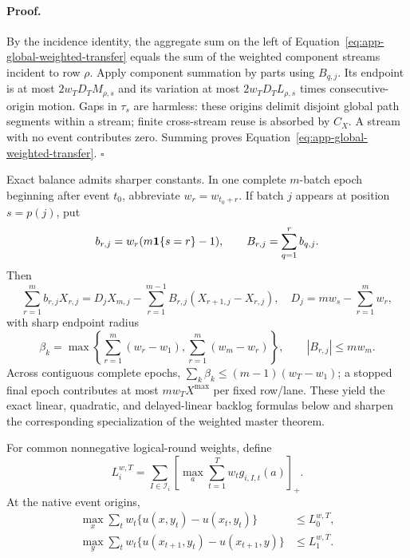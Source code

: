\paragraph{Proof.}
By the incidence identity, the aggregate sum on the left of
Equation~\ref{eq:app-global-weighted-transfer} equals the sum of the weighted
component streams incident to row $\rho$.  Apply component summation by parts
using $B_{q,j}$.  Its endpoint is at most
$2w_TD_TM_{\rho,s}$ and its variation at most
$2w_TD_TL_{\rho,s}$ times consecutive-origin motion.  Gaps in $\tau_s$ are
harmless: these origins delimit disjoint global path segments within a stream;
finite cross-stream reuse is absorbed by $C_X$.  A stream with no event
contributes zero.  Summing proves
Equation~\ref{eq:app-global-weighted-transfer}. \hfill$\square$

Exact balance admits sharper constants.  In one complete $m$-batch epoch
beginning after event $t_0$, abbreviate $w_r=w_{t_0+r}$.  If batch $j$ appears
at position $s=p(j)$, put
\begin{equation}
 b_{r,j}=w_r(m\mathbf 1\{s=r\}-1),\qquad
 B_{r,j}=\sum_{q=1}^r b_{q,j}.
\end{equation}
Then
\begin{equation}
 \sum_{r=1}^m b_{r,j}X_{r,j}
 =D_jX_{m,j}-\sum_{r=1}^{m-1}B_{r,j}(X_{r+1,j}-X_{r,j}),
 \quad D_j=mw_s-\sum_{r=1}^m w_r,
\label{eq:app-weighted-balance-identity}
\end{equation}
with sharp endpoint radius
\begin{equation}
 \beta_k=\max\left\{
 \sum_{r=1}^m(w_r-w_1),
 \sum_{r=1}^m(w_m-w_r)\right\},
 \qquad |B_{r,j}|\le mw_m .
\label{eq:app-weighted-backlog-radius}
\end{equation}
Across contiguous complete epochs,
$\sum_k\beta_k\le(m-1)(w_T-w_1)$; a stopped final epoch contributes at most
$mw_TX^{\max}$ per fixed row/lane.  These yield the exact linear, quadratic,
and delayed-linear backlog formulas below and sharpen the corresponding
specialization of the weighted master theorem.

\begin{lemma}
\label{lem:app-weighted-perfect-recall}
For common nonnegative logical-round weights, define
\begin{equation}
L_i^{w,T}=\sum_{I\in\mathcal I_i}
 \left[\max_a\sum_{t=1}^T w_t g_{i,I,t}(a)\right]_+ .
\label{eq:app-weighted-target-local-regret}
\end{equation}
At the native event origins,
\begin{align}
\max_x\sum_t w_t\{u(x,y_t)-u(x_t,y_t)\}&\le L_0^{w,T},\nonumber\\
\max_y\sum_t w_t\{u(x_{t+1},y_t)-u(x_{t+1},y)\}&\le L_1^{w,T}.
\label{eq:app-weighted-local-to-external}
\end{align}
\end{lemma}

